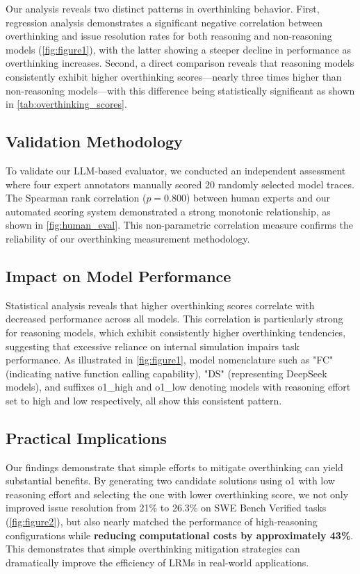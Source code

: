 Our analysis reveals two distinct patterns in overthinking behavior. First, regression analysis demonstrates a significant negative correlation between overthinking and issue resolution rates for both reasoning and non-reasoning models (\cref{fig:figure1}), with the latter showing a steeper decline in performance as overthinking increases. Second, a direct comparison reveals that reasoning models consistently exhibit higher overthinking scores—nearly three times higher than non-reasoning models—with this difference being statistically significant as shown in \cref{tab:overthinking_scores}.

\subsection{Validation Methodology}
To validate our LLM-based evaluator, we conducted an independent assessment where four expert annotators manually scored 20 randomly selected model traces. The Spearman rank correlation ($p = 0.800$) between human experts and our automated scoring system demonstrated a strong monotonic relationship, as shown in \cref{fig:human_eval}. This non-parametric correlation measure confirms the reliability of our overthinking measurement methodology.

\subsection{Impact on Model Performance}
Statistical analysis reveals that higher overthinking scores correlate with decreased performance across all models. This correlation is particularly strong for reasoning models, which exhibit consistently higher overthinking tendencies, suggesting that excessive reliance on internal simulation impairs task performance. As illustrated in \cref{fig:figure1}, model nomenclature such as "FC" (indicating native function calling capability), "DS" (representing DeepSeek models), and suffixes o1\_high and o1\_low denoting models with reasoning effort set to high and low respectively, all show this consistent pattern.

\subsection{Practical Implications}
Our findings demonstrate that simple efforts to mitigate overthinking can yield substantial benefits. By generating two candidate solutions using o1 with low reasoning effort and selecting the one with lower overthinking score, we not only improved issue resolution from 21\% to 26.3\% on SWE Bench Verified tasks (\cref{fig:figure2}), but also nearly matched the performance of high-reasoning configurations while \textbf{reducing computational costs by approximately 43\%}. This demonstrates that simple overthinking mitigation strategies can dramatically improve the efficiency of LRMs in real-world applications.

